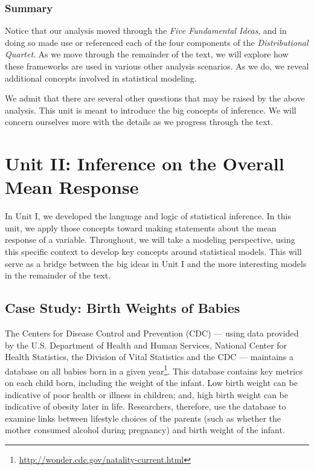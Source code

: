 \documentclass[
  letterpaper,
  DIV=11,
  numbers=noendperiod]{scrreprt}
\theoremstyle{definition}
\theoremstyle{definition}
\theoremstyle{plain}
\theoremstyle{remark}
\begin{document}
\hypertarget{summary}{%
\section{Summary}\label{summary}}

Notice that our analysis moved through the \emph{Five Fundamental
Ideas}, and in doing so made use or referenced each of the four
components of the \emph{Distributional Quartet}. As we move through the
remainder of the text, we will explore how these frameworks are used in
various other analysis scenarios. As we do, we reveal additional
concepts involved in statistical modeling.

We admit that there are several other questions that may be raised by
the above analysis. This unit is meant to introduce the big concepts of
inference. We will concern ourselves more with the details as we
progress through the text.

\part{Unit II: Inference on the Overall Mean Response}

In Unit I, we developed the language and logic of statistical inference.
In this unit, we apply those concepts toward making statements about the
mean response of a variable. Throughout, we will take a modeling
perspective, using this specific context to develop key concepts around
statistical models. This will serve as a bridge between the big ideas in
Unit I and the more interesting models in the remainder of the text.

\hypertarget{sec-casebabies}{%
\chapter{Case Study: Birth Weights of Babies}\label{sec-casebabies}}

The Centers for Disease Control and Prevention (CDC) --- using data
provided by the U.S. Department of Health and Human Services, National
Center for Health Statistics, the Division of Vital Statistics and the
CDC --- maintains a database on all babies born in a given
year\footnote{\url{http://wonder.cdc.gov/natality-current.html}}. This
database contains key metrics on each child born, including the weight
of the infant. Low birth weight can be indicative of poor health or
illness in children; and, high birth weight can be indicative of obesity
later in life. Researchers, therefore, use the database to examine links
between lifestyle choices of the parents (such as whether the mother
consumed alcohol during pregnancy) and birth weight of the infant.
\end{document}
